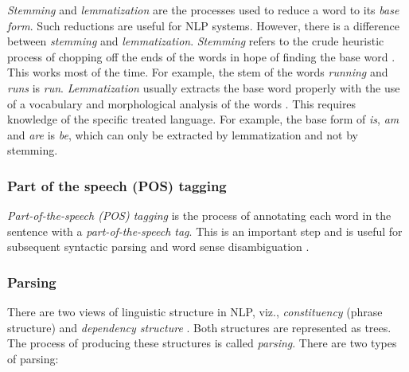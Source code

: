 \textit{Stemming} and \textit{lemmatization} are the processes used to reduce a word to its \emph{base form}. Such reductions are useful for NLP systems. However, there is a difference between \textit{stemming} and \textit{lemmatization}. \textit{Stemming} refers to the crude heuristic process of chopping off the ends of the words in hope of finding the base word \cite{stemminglemmatization}. This works most of the time. For example, the stem of the words \textit{running} and \textit{runs} is \textit{run}. \textit{Lemmatization} usually extracts the base word properly with the use of a vocabulary and morphological analysis of the words \cite{stemminglemmatization}. This requires knowledge of the specific treated language. For example, the base form of \textit{is}, \textit{am} and \textit{are} is \textit{be}, which can only be extracted by lemmatization and not by stemming.

\subsubsection{Part of the speech (POS) tagging}


\textit{Part-of-the-speech (POS) tagging} is the process of annotating each word in the sentence with a \emph{part-of-the-speech tag}. This is an important step and is useful for subsequent syntactic parsing and word sense disambiguation \cite{nlpcourse}.

\subsubsection{Parsing}

There are two views of linguistic structure in NLP, viz., \emph{constituency} (phrase structure) and \emph{dependency structure} \cite{parsing}. Both structures are represented as trees. The process of producing these structures is called \emph{parsing}. There are two types of parsing:

